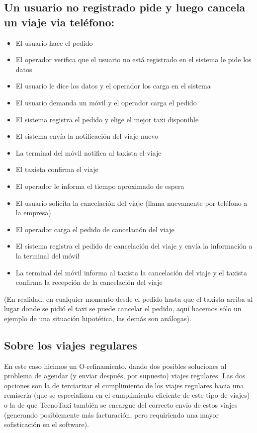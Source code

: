 \documentclass[a4paper]{artcle}
\begin{document}
\subsection{Un usuario no registrado pide y luego cancela un viaje via tel\'efono:}
\begin{itemize}
\item El usuario hace el pedido
\item El operador verifica que el usuario no est\'a registrado en el sistema le pide los datos
\item El usuario le dice los datos y el operador los carga en el sistema
\item El usuario demanda un m\'ovil y el operador carga el pedido
\item El sistema registra el pedido y elige el mejor taxi disponible
\item El sistema env\'ia la notificaci\'on del viaje nuevo
\item La terminal del m\'ovil notifica al taxista el viaje
\item El taxista confirma el viaje
\item El operador le informa el tiempo aproximado de espera
\item El usuario solicita la cancelaci\'on del viaje (llama nuevamente por tel\'efono a la empresa)
\item El operador carga el pedido de cancelaci\'on del viaje
\item El sistema registra el pedido de cancelaci\'on del viaje y env\'ia la informaci\'on a la terminal del m\'ovil
\item La terminal del m\'ovil informa al taxista la cancelaci\'on del viaje y el taxista confirma la recepci\'on de la cancelaci\'on del viaje
\end{itemize}
(En realidad, en cualquier momento desde el pedido hasta que el taxista arriba al lugar donde se pidi\'o el taxi se puede cancelar el pedido, aqu\'i hacemos s\'olo un ejemplo de una situaci\'on hipot\'etica, las dem\'as son an\'alogas).

\subsection{Sobre los viajes regulares}
En este caso hicimos un O-refinamiento, dando dos posibles soluciones al problema de agendar (y enviar despu\'es, por supuesto)
viajes regulares. Las dos opciones son la de terciarizar el cumplimiento de los viajes regulares hacia una remiser\'ia (que se especializan en el cumplimiento eficiente de este tipo de viajes) o la de que TecnoTaxi tambi\'en se encargue del correcto env\'io
de estos viajes (generando posiblemente m\'as facturaci\'on, pero requiriendo una mayor sofisticaci\'on en el software).\\
\end{document}
